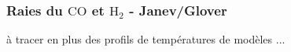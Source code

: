 

\subsubsection{Raies du $\mathrm{CO}$ et $\mathrm{H}_2$ - Janev/Glover}
à tracer en plus des profils de températures de modèles ...






